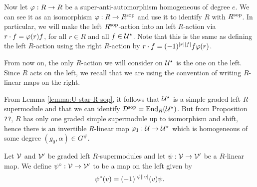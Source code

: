 \documentclass{amsbook}
\begin{document}

Now let $\varphi: R\to R$ be a super-anti-automorphism homogeneous of degree $e$.
We can see it as an isomorphism $\varphi: R\to R^{\mathrm{sop}}$ and use it to identify $R$ with $R^{\mathrm{sop}}$. In particular, we will make the left $R^{\mathrm{sop}}$-action into an left $R$-action via $r\cdot f = \varphi(r)f$, for all $r\in R$ and all $f\in \mathcal U^\star$. Note that this is the same as defining the left $R$-action using the right $R$-action by $r\cdot f = (-1)^{|r||f|} f \varphi(r)$. 

From now on, the only $R$-action we will consider on $\mathcal U^\star$ is the one on the left. Since $R$ acts on the left, we recall that we are using the convention of writing $R$-linear maps on the right.

From Lemma \ref{lemma:U-star-R-sop}, it follows that $\mathcal U^\star$ is a simple graded left $R$-supermodule and that we can identify $\mathcal{D}^{\mathrm{sop}} = \operatorname{End}_R (\mathcal U^\star)$. But from Proposition {\tt ??}, $R$ has only one graded simple supermodule up to isomorphism and shift, hence there is an invertible $R$-linear map $\varphi_1: \mathcal U \to \mathcal U^\star$ which is homogeneous of some degree $(g_0, \alpha)\in G^\#$.



\begin{defi}
    Let $\mathcal V$ and $\mathcal V'$ be graded left $R$-supermodules and let $\psi: \mathcal V \to \mathcal V'$ be a $R$-linear map. We define $\psi^\circ: \mathcal V \to \mathcal V'$ to be a map on the left given by
    \[
        \psi^\circ(v) = (-1)^{|\psi||v|} (v)\psi.
    \]
\end{defi}
\end{document}
